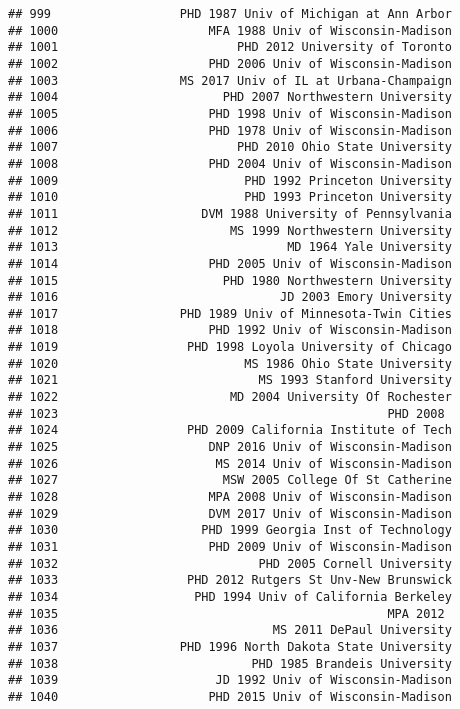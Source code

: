 \documentclass[
]{article}
\begin{document}
\begin{verbatim}
## 999                  PHD 1987 Univ of Michigan at Ann Arbor
## 1000                     MFA 1988 Univ of Wisconsin-Madison
## 1001                         PHD 2012 University of Toronto
## 1002                     PHD 2006 Univ of Wisconsin-Madison
## 1003                 MS 2017 Univ of IL at Urbana-Champaign
## 1004                       PHD 2007 Northwestern University
## 1005                     PHD 1998 Univ of Wisconsin-Madison
## 1006                     PHD 1978 Univ of Wisconsin-Madison
## 1007                         PHD 2010 Ohio State University
## 1008                     PHD 2004 Univ of Wisconsin-Madison
## 1009                          PHD 1992 Princeton University
## 1010                          PHD 1993 Princeton University
## 1011                    DVM 1988 University of Pennsylvania
## 1012                        MS 1999 Northwestern University
## 1013                                MD 1964 Yale University
## 1014                     PHD 2005 Univ of Wisconsin-Madison
## 1015                       PHD 1980 Northwestern University
## 1016                               JD 2003 Emory University
## 1017                 PHD 1989 Univ of Minnesota-Twin Cities
## 1018                     PHD 1992 Univ of Wisconsin-Madison
## 1019                  PHD 1998 Loyola University of Chicago
## 1020                          MS 1986 Ohio State University
## 1021                            MS 1993 Stanford University
## 1022                        MD 2004 University Of Rochester
## 1023                                              PHD 2008 
## 1024                  PHD 2009 California Institute of Tech
## 1025                     DNP 2016 Univ of Wisconsin-Madison
## 1026                      MS 2014 Univ of Wisconsin-Madison
## 1027                       MSW 2005 College Of St Catherine
## 1028                     MPA 2008 Univ of Wisconsin-Madison
## 1029                     DVM 2017 Univ of Wisconsin-Madison
## 1030                    PHD 1999 Georgia Inst of Technology
## 1031                     PHD 2009 Univ of Wisconsin-Madison
## 1032                            PHD 2005 Cornell University
## 1033                  PHD 2012 Rutgers St Unv-New Brunswick
## 1034                   PHD 1994 Univ of California Berkeley
## 1035                                              MPA 2012 
## 1036                              MS 2011 DePaul University
## 1037                 PHD 1996 North Dakota State University
## 1038                           PHD 1985 Brandeis University
## 1039                      JD 1992 Univ of Wisconsin-Madison
## 1040                     PHD 2015 Univ of Wisconsin-Madison

\end{verbatim}
\end{document}
